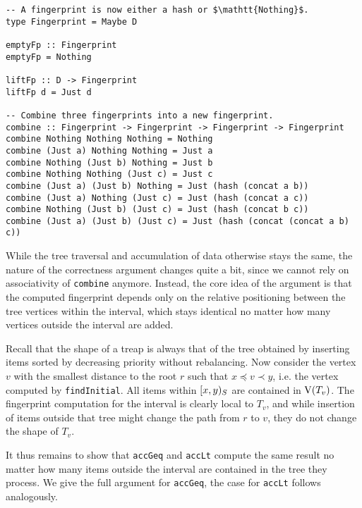 \begin{verbatim}
-- A fingerprint is now either a hash or $\mathtt{Nothing}$.
type Fingerprint = Maybe D

emptyFp :: Fingerprint
emptyFp = Nothing

liftFp :: D -> Fingerprint
liftFp d = Just d

-- Combine three fingerprints into a new fingerprint.
combine :: Fingerprint -> Fingerprint -> Fingerprint -> Fingerprint
combine Nothing Nothing Nothing = Nothing
combine (Just a) Nothing Nothing = Just a
combine Nothing (Just b) Nothing = Just b
combine Nothing Nothing (Just c) = Just c
combine (Just a) (Just b) Nothing = Just (hash (concat a b))
combine (Just a) Nothing (Just c) = Just (hash (concat a c))
combine Nothing (Just b) (Just c) = Just (hash (concat b c))
combine (Just a) (Just b) (Just c) = Just (hash (concat (concat a b) c))
\end{verbatim}

While the tree traversal and accumulation of data otherwise stays the same, the nature of the correctness argument changes quite a bit, since we cannot rely on associativity of \texttt{combine} anymore. Instead, the core idea of the argument is that the computed fingerprint depends only on the relative positioning between the tree vertices within the interval, which stays identical no matter how many vertices outside the interval are added.

Recall that the shape of a treap is always that of the tree obtained by inserting items sorted by decreasing priority without rebalancing. Now consider the vertex $v$ with the smallest distance to the root $r$ such that $x \preceq v \prec y$, i.e. the vertex computed by \texttt{findInitial}. All items within $[{x},{y})_{S}$ are contained in $\operatorname{V}(T_v)$. The fingerprint computation for the interval is clearly local to $T_v$, and while insertion of items outside that tree might change the path from $r$ to $v$, they do not change the shape of $T_v$.

It thus remains to show that \texttt{accGeq} and \texttt{accLt} compute the same result no matter how many items outside the interval are contained in the tree they process. We give the full argument for \texttt{accGeq}, the case for \texttt{accLt} follows analogously.

